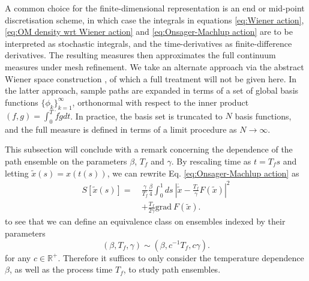A common choice for the finite-dimensional representation is an end or mid-point discretisation scheme, in which case the integrals in equations \ref{eq:Wiener action}, \ref{eq:OM density wrt Wiener action} and \ref{eq:Onsager-Machlup action} are to be interpreted as stochastic integrals, and the time-derivatives as finite-difference derivatives. The resulting measures then approximates the full continuum measures under mesh refinement. We take an alternate approach via the abstract Wiener space construction \citep{grossAbstractWienerSpaces}, of which a full treatment will not be given here. In the latter approach, sample paths are expanded in terms of a set of global basis functions $\{\phi_k\}_{k=1}^\infty$, orthonormal with respect to the inner product $(f,g) = \int_0^T \dot{f} \dot{g} dt$. In practice, the basis set is truncated to $N$ basis functions, and the full measure is defined in terms of a limit procedure as $N \to \infty$.

This subsection will conclude with a remark concerning the dependence of the path ensemble on the parameters $\beta$, $T_f$ and $\gamma$. By rescaling time as $t = T_f s$ and letting $\tilde{x}(s) = x(t(s))$, we can rewrite Eq. \ref{eq:Onsager-Machlup action} as
\begin{equation}
\begin{aligned}
S[\tilde{x}(s)] =\ & \frac{\gamma}{T_f} \frac{\beta}{4}  \int_0^1 ds\ \left| \dot{\tilde{x}} - \frac{T_f}{\gamma} F(\tilde{x}) \right|^2  \\
& + \frac{T_f}{2 \gamma} \text{grad}\ F(\tilde{x}).
\end{aligned}
\end{equation}
to see that we can define an equivalence class on ensembles indexed by their parameters
\begin{equation}
(\beta, T_f, \gamma) \sim (\beta, c^{-1} T_f, c \gamma).
\end{equation}
for any $c \in \mathbb{R}^+$. Therefore it suffices to only consider the temperature dependence $\beta$, as well as the process time $T_f$, to study path ensembles.

